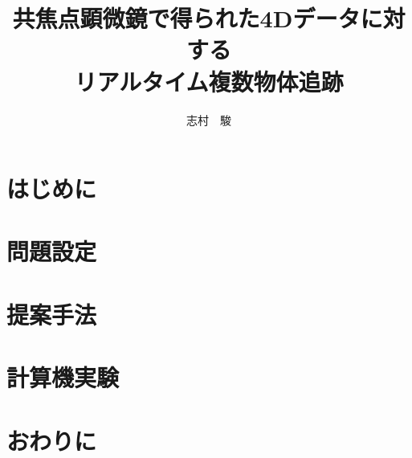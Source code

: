 \documentclass[11pt]{jsbook}
\title{共焦点顕微鏡で得られた4Dデータに対する\\リアルタイム複数物体追跡}
\author{志村　駿}
\begin{document}
    \maketitle
    \cleardoublepage %
    \tableofcontents
    \thispagestyle{fancy2}
    \listoffigures %
    \thispagestyle{fancy2}
    \listoftables %
    \thispagestyle{fancy2}
    \cleardoublepage %


    \chapter{はじめに}
    

    \chapter{問題設定}
    

    \chapter{提案手法}
    

    \chapter{計算機実験}
    

    \chapter{おわりに}
    

    
    
\end{document}
